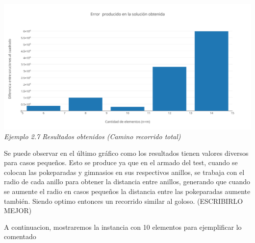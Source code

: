 \vspace*{0.3cm} \vspace*{0.3cm}
  \begin{center}
\includegraphics[scale=0.40]{./EJ2/anillosdif.png}
\\{\textit{Ejemplo 2.7 Resultados obtenidos (Camino recorrido total) }}
  \end{center}
  \vspace*{0.3cm}

Se puede observar en el \'ultimo gr\'afico como los resultados tienen valores diversos para casos pequeños. Esto se produce ya que en el armado del test, cuando se colocan las pokeparadas y gimnasios en sus respectivos anillos, se trabaja con el radio de cada anillo para obtener la distancia entre anillos, generando que cuando se aumente el radio en casos pequeños la distancia entre las pokeparadas aumente tambi\'en. Siendo optimo entonces un recorrido similar al goloso. (ESCRIBIRLO MEJOR)

A continuacion, mostraremos la instancia con 10 elementos para ejemplificar lo comentado \\\\\\\\\\
\begin{figure} [!ht]
 \centering
       \label{fig:jaggies}
    \label{fig:moire}
    \end{figure}
    
